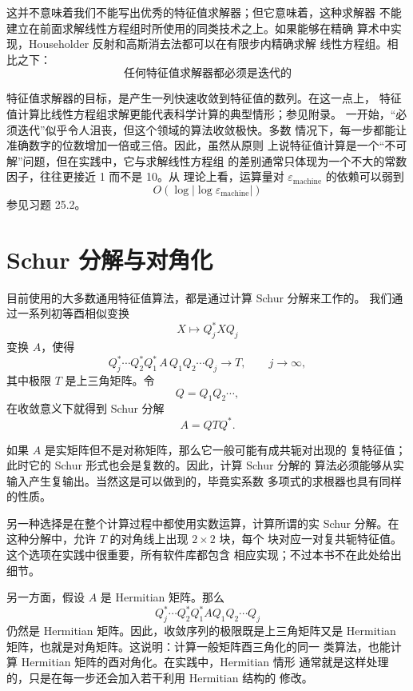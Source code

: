 \documentclass[UTF8,fontset=none,12pt]{ctexart}
\newcommand{\epsmach}{\varepsilon_{\mathrm{machine}}}
\begin{document}
这并不意味着我们不能写出优秀的特征值求解器；但它意味着，这种求解器
不能建立在前面求解线性方程组时所使用的同类技术之上。如果能够在精确
算术中实现，Householder 反射和高斯消去法都可以在有限步内精确求解
线性方程组。相比之下：
\begin{equation*}
 \boxed{\text{任何特征值求解器都必须是迭代的}}
\end{equation*}

特征值求解器的目标，是产生一列快速收敛到特征值的数列。在这一点上，
特征值计算比线性方程组求解更能代表科学计算的典型情形；参见附录。
一开始，“必须迭代”似乎令人沮丧，但这个领域的算法收敛极快。多数
情况下，每一步都能让准确数字的位数增加一倍或三倍。因此，虽然从原则
上说特征值计算是一个“不可解”问题，但在实践中，它与求解线性方程组
的差别通常只体现为一个不大的常数因子，往往更接近 1 而不是 10。从
理论上看，运算量对 $\epsmach$ 的依赖可以弱到
\begin{equation*}
 O\!\left(\log\left|\log\epsmach\right|\right)
\end{equation*}
参见习题 25.2。

\section*{Schur 分解与对角化}

目前使用的大多数通用特征值算法，都是通过计算 Schur 分解来工作的。
我们通过一系列初等酉相似变换
\[
 X\longmapsto Q_j^*XQ_j
\]
变换 $A$，使得
\begin{equation}
 Q_j^*\cdots Q_2^*Q_1^*\,A\,Q_1Q_2\cdots Q_j
 \longrightarrow T,\qquad j\to\infty,
 \tag{25.4}
\end{equation}
其中极限 $T$ 是上三角矩阵。令
\[
 Q=Q_1Q_2\cdots,
\]
在收敛意义下就得到 Schur 分解
\[
 A=QTQ^*.
\]

如果 $A$ 是实矩阵但不是对称矩阵，那么它一般可能有成共轭对出现的
复特征值；此时它的 Schur 形式也会是复数的。因此，计算 Schur 分解的
算法必须能够从实输入产生复输出。当然这是可以做到的，毕竟实系数
多项式的求根器也具有同样的性质。

另一种选择是在整个计算过程中都使用实数运算，计算所谓的实 Schur
分解。在这种分解中，允许 $T$ 的对角线上出现 $2\times2$ 块，每个
块对应一对复共轭特征值。这个选项在实践中很重要，所有软件库都包含
相应实现；不过本书不在此处给出细节。

另一方面，假设 $A$ 是 Hermitian 矩阵。那么
\[
 Q_j^*\cdots Q_2^*Q_1^*AQ_1Q_2\cdots Q_j
\]
仍然是 Hermitian 矩阵。因此，收敛序列的极限既是上三角矩阵又是
Hermitian 矩阵，也就是对角矩阵。这说明：计算一般矩阵酉三角化的同一
类算法，也能计算 Hermitian 矩阵的酉对角化。在实践中，Hermitian 情形
通常就是这样处理的，只是在每一步还会加入若干利用 Hermitian 结构的
修改。
\end{document}
